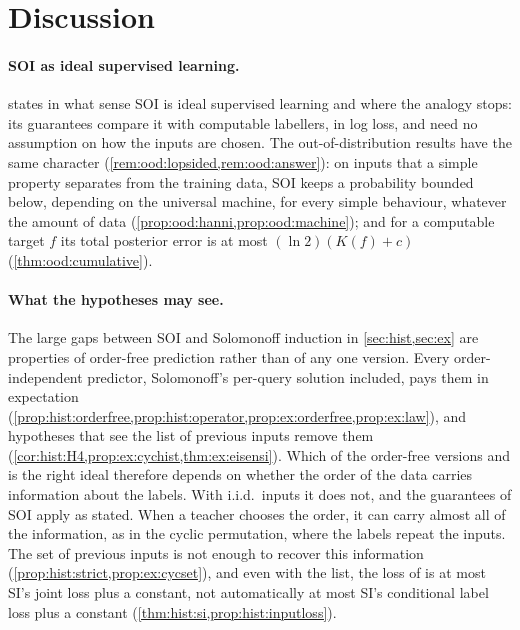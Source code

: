 \section{Discussion}\label{sec:discussion}

\paragraph{SOI as ideal supervised learning.}  states in what sense SOI is ideal supervised learning and where the analogy stops: its guarantees compare it with computable labellers, in log loss, and need no assumption on how the inputs are chosen. The out-of-distribution results have the same character (\cref{rem:ood:lopsided,rem:ood:answer}): on inputs that a simple property separates from the training data, SOI keeps a probability bounded below, depending on the universal machine, for every simple behaviour, whatever the amount of data (\cref{prop:ood:hanni,prop:ood:machine}); and for a computable target $f$ its total posterior error is at most $(\ln2)(K(f)+c)$ (\cref{thm:ood:cumulative}).

\paragraph{What the hypotheses may see.} The large gaps between SOI and Solomonoff induction in \cref{sec:hist,sec:ex} are properties of order-free prediction rather than of any one version. Every order-independent predictor, Solomonoff's per-query solution included, pays them in expectation (\cref{prop:hist:orderfree,prop:hist:operator,prop:ex:orderfree,prop:ex:law}), and hypotheses that see the list of previous inputs remove them (\cref{cor:hist:H4,prop:ex:cychist,thm:ex:eisensi}). Which of the order-free versions and \SFIhist{} is the right ideal therefore depends on whether the order of the data carries information about the labels. With i.i.d.\ inputs it does not, and the guarantees of SOI apply as stated. When a teacher chooses the order, it can carry almost all of the information, as in the cyclic permutation, where the labels repeat the inputs. The set of previous inputs is not enough to recover this information (\cref{prop:hist:strict,prop:ex:cycset}), and even with the list, the loss of \SFIhist{} is at most SI's joint loss plus a constant, not automatically at most SI's conditional label loss plus a constant (\cref{thm:hist:si,prop:hist:inputloss}).

